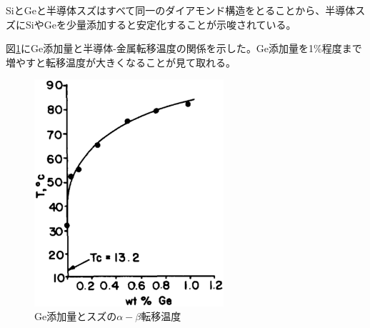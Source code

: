 SiとGeと半導体スズはすべて同一のダイアモンド構造をとることから、半導体スズにSiやGeを少量添加すると安定化することが示唆されている\cite{Ewald1954,Gallerneault1983}。

図\ref{fig:Ge_Stabilized_Sn}にGe添加量と半導体-金属転移温度の関係を示した\cite{Vnuk1984}。Ge添加量を1\%程度まで増やすと転移温度が大きくなることが見て取れる。
\begin{figure}[htb]
    \begin{center}
   \includegraphics[width=70mm]{Introduction/Ge_Stabilized_Sn.eps}
  \end{center}
  \caption{Ge添加量とスズの$\alpha-\beta$転移温度\cite{Vnuk1984}}
  \label{fig:Ge_Stabilized_Sn}
\end{figure}

